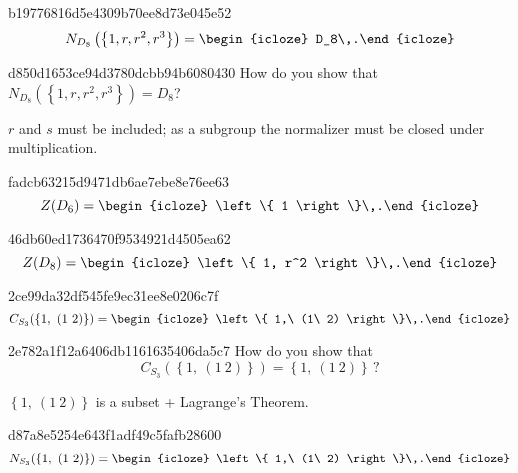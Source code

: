 \begin{note}{b19776816d5e4309b70ee8d73e045e52}
    \[
        N_{D_8}\left( \left\{ 1, r, r^2, r^3 \right\} \right) = \begin{icloze}{1}D_8\,.\end{icloze}
    \]
\end{note}

\begin{note}{d850d1653ce94d3780dcbb94b6080430}
    How do you show that \({ N_{D_8}\left( \left\{ 1, r, r^2, r^3 \right\} \right) = D_8 }\)?

    \begin{cloze}{1}
        \({ r }\) and \({ s }\) must be included; as a subgroup the normalizer must be closed under multiplication.
    \end{cloze}
\end{note}

\begin{note}{fadcb63215d9471db6ae7ebe8e76ee63}
    \[
        Z(D_6) = \begin{icloze}{1}\left\{ 1 \right\}\,.\end{icloze}
    \]
\end{note}

\begin{note}{46db60ed1736470f9534921d4505ea62}
    \[
        Z(D_8) = \begin{icloze}{1}\left\{ 1, r^2 \right\}\,.\end{icloze}
    \]
\end{note}

\begin{note}{2ce99da32df545fe9ec31ee8e0206c7f}
    \[
        C_{S_3}(\left\{ 1,\ (1\ 2) \right\}) = \begin{icloze}{1}\left\{ 1,\ (1\ 2) \right\}\,.\end{icloze}
    \]
\end{note}

\begin{note}{2e782a1f12a6406db1161635406da5c7}
    How do you show that
    \[
        C_{S_3}(\left\{ 1,\ (1\ 2) \right\}) = \left\{ 1,\ (1\ 2) \right\}\,?
    \]

    \begin{cloze}{1}
        \({ \left\{ 1,\ (1\ 2) \right\} }\) is a subset + Lagrange's Theorem.
    \end{cloze}
\end{note}

\begin{note}{d87a8e5254e643f1adf49c5fafb28600}
    \[
        N_{S_3}(\left\{ 1,\ (1\ 2) \right\}) = \begin{icloze}{1}\left\{ 1,\ (1\ 2) \right\}\,.\end{icloze}
    \]
\end{note}

